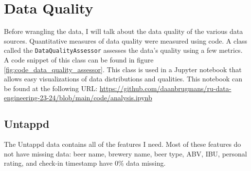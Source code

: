 \documentclass[sigconf, natbib=true]{acmart}
\begin{document}

\section{Data Quality}
Before wrangling the data, I will talk about the data quality of the various data sources.
Quantitative measures of data quality were measured using code.
A class called the \texttt{DataQualityAssessor} assesses the data's quality using a few metrics.
A code snippet of this class can be found in figure \ref{fig:code_data_quality_assessor}.
This class is used in a Jupyter notebook that allows easy visualizations of data distributions and qualities.
This notebook can be found at the following URL: \url{https://github.com/daanbrugmans/ru-data-engineering-23-24/blob/main/code/analysis.ipynb}

\subsection{Untappd}
The Untappd data contains all of the features I need.
Most of these features do not have missing data: beer name, brewery name, beer type, ABV, IBU, personal rating, and check-in timestamp have 0\% data missing.
\end{document}
